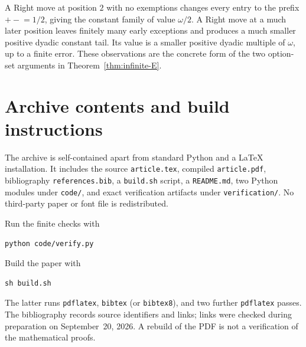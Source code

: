 \documentclass[11pt,letterpaper]{article}
\theoremstyle{definition}
\theoremstyle{remark}
\begin{document}
A Right move at position $2$ with no exemptions changes every entry to the
prefix $\mathtt{+-}=1/2$, giving the constant family of value $\omega/2$.
A Right move at a much later position leaves finitely many early exceptions and
produces a much smaller positive dyadic constant tail. Its value is a smaller
positive dyadic multiple of $\omega$, up to a finite error. These observations
are the concrete form of the two option-set arguments in
Theorem~\ref{thm:infinite-E}.

\section{Archive contents and build instructions}

The archive is self-contained apart from standard Python and a LaTeX
installation. It includes the source \texttt{article.tex}, compiled
\texttt{article.pdf}, bibliography \texttt{references.bib}, a \texttt{build.sh}
script, a \texttt{README.md}, two Python modules under \texttt{code/}, and exact
verification artifacts under \texttt{verification/}. No third-party paper or
font file is redistributed.

Run the finite checks with
\begin{verbatim}
python code/verify.py
\end{verbatim}
Build the paper with
\begin{verbatim}
sh build.sh
\end{verbatim}
The latter runs \texttt{pdflatex}, \texttt{bibtex} (or \texttt{bibtex8}), and two
further \texttt{pdflatex} passes. The bibliography records source identifiers and links;
links were checked during preparation on September~20, 2026. A rebuild of the
PDF is not a verification of the mathematical proofs.

\clearpage
{}
{}
\begingroup
\raggedright


\endgroup
\end{document}
